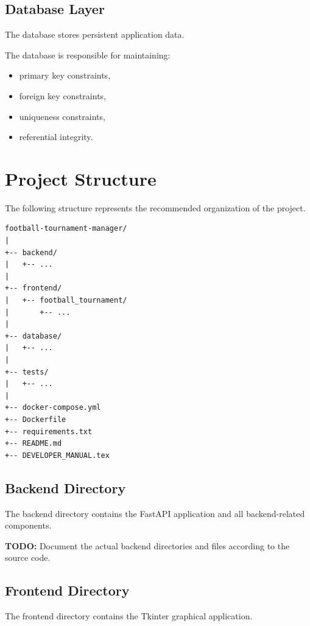 \documentclass[12pt,a4paper]{article}
\begin{document}
\subsection{Database Layer}

The database stores persistent application data.

The database is responsible for maintaining:

\begin{itemize}
    \item primary key constraints,
    \item foreign key constraints,
    \item uniqueness constraints,
    \item referential integrity.
\end{itemize}


\section{Project Structure}

The following structure represents the recommended organization of
the project.

\begin{lstlisting}
football-tournament-manager/
|
+-- backend/
|   +-- ...
|
+-- frontend/
|   +-- football_tournament/
|       +-- ...
|
+-- database/
|   +-- ...
|
+-- tests/
|   +-- ...
|
+-- docker-compose.yml
+-- Dockerfile
+-- requirements.txt
+-- README.md
+-- DEVELOPER_MANUAL.tex
\end{lstlisting}

\subsection{Backend Directory}

The backend directory contains the FastAPI application and all
backend-related components.

\textbf{TODO:} Document the actual backend directories and files
according to the source code.

\subsection{Frontend Directory}

The frontend directory contains the Tkinter graphical application.
\end{document}
